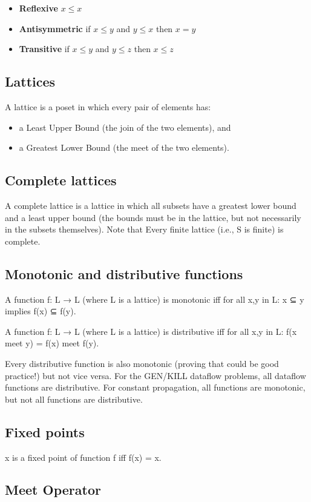 \begin{itemize}
\item \textbf{Reflexive} \(x \leq x\)
\item \textbf{Antisymmetric} if \(x \leq y\) and \(y \leq x\) then \(x = y\)
\item \textbf{Transitive} if \(x \leq y\) and \(y \leq z\) then \(x \leq z\)
\end{itemize} 



\subsection{Lattices}

A lattice is a poset in which every pair of elements has:

\begin{itemize}
\item a Least Upper Bound (the join of the two elements), and
\item a Greatest Lower Bound (the meet of the two elements).
\end{itemize}    



\subsection{Complete lattices}


A complete lattice is a lattice in which all subsets have a greatest lower bound 
and a least upper bound (the bounds must be in the lattice, but not necessarily 
in the subsets themselves). Note that Every finite lattice (i.e., S is finite) is complete.


\subsection{Monotonic and distributive functions}

A function f: L → L (where L is a lattice) is monotonic iff for all x,y in L: x ⊆ y implies f(x) ⊆ f(y).

A function f: L → L (where L is a lattice) is distributive iff for all x,y in L: f(x meet y) = f(x) meet f(y).

Every distributive function is also monotonic (proving that could be good practice!) but not vice versa. For the GEN/KILL dataflow problems, all dataflow functions are distributive. For constant propagation, all functions are monotonic, but not all functions are distributive.


\subsection{Fixed points}

x is a fixed point of function f iff f(x) = x.

\subsection{Meet Operator}


